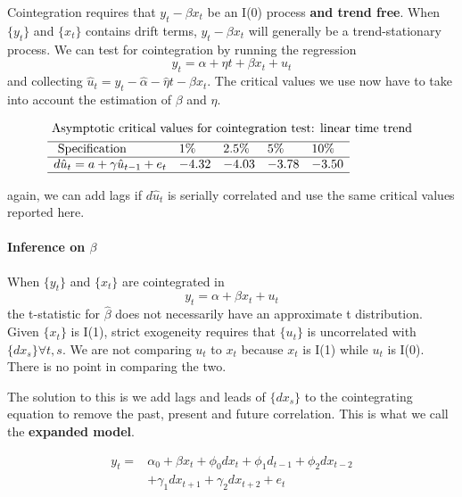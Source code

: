 \documentclass[11pt]{article}
\begin{document}
Cointegration requires that $y_t - \beta x_t$ be an I(0) process \textbf{and trend free}. When $\{y_t\}$ and $\{x_t\}$ contains drift terms, $y_t - \beta x_t$ will generally be a trend-stationary process. We can test for cointegration by running the regression
\[y_t = \alpha + \eta t + \beta x_t + u_t\]
and collecting $\hat{u}_t = y_t - \hat{\alpha} - \hat{\eta} t - \hat{\beta} x_t $. The critical values we use now have to take into account the estimation of $\beta$ and $\eta$.

\begin{equation}
\begin{aligned}
&\text { Asymptotic critical values for cointegration test: linear time trend }\\
&\begin{array}{lllll}
\hline \text { Specification } & 1 \% & 2.5 \% & 5 \% & 10 \% \\
\hline d \hat{u}_t=a+\gamma \hat{u}_{t-1}+e_t & -4.32 & -4.03 & -3.78 & -3.50 \\
\hline
\end{array}
\end{aligned}
\end{equation}

again, we can add lags if $d\hat{u}_t$ is serially correlated and use the same critical values reported here.

\paragraph{Inference on $\beta$} \mbox{}

When $\{y_t\}$ and $\{x_t\}$ are cointegrated in
\[y_t = \alpha + \beta x_t + u_t\]
the t-statistic for $\hat{\beta}$ does not necessarily have an approximate t distribution. Given $\{x_t\}$ is I(1), strict exogeneity requires that $\{u_t\}$ is uncorrelated with $\{dx_s\} \forall t,s$. We are not comparing $u_t$ to $x_t$ because $x_t$ is I(1) while $u_t$ is I(0). There is no point in comparing the two.

The solution to this is we add lags and leads of $\{dx_s\}$ to the cointegrating equation to remove the past, present and future correlation. This is what we call the \textbf{expanded model}.

\begin{equation}
\begin{aligned}
y_t= & \alpha_0+\beta x_t+\phi_0 d x_t+\phi_1 d_{t-1}+\phi_2 d x_{t-2} \\
& +\gamma_1 d x_{t+1}+\gamma_2 d x_{t+2}+e_t
\end{aligned}
\end{equation}
\end{document}
